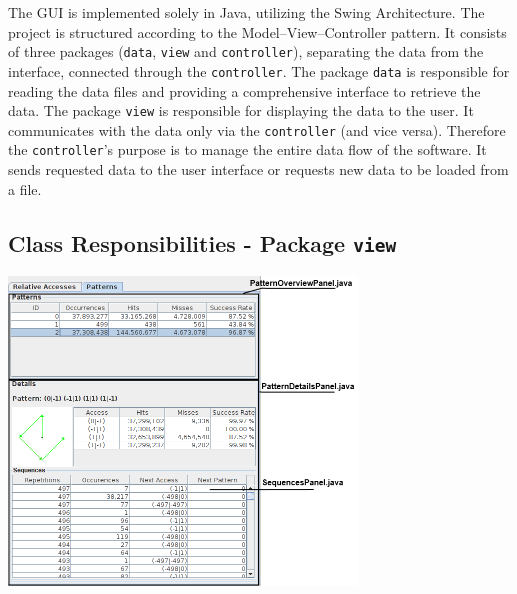 The GUI is implemented solely in Java, utilizing the Swing Architecture. The project is structured according to the Model–View–Controller pattern. It consists of three packages (\texttt{data}, \texttt{view} and \texttt{controller}), separating the data from the interface, connected through the \texttt{controller}. The package \texttt{data} is responsible for reading the data files and providing a comprehensive interface to retrieve the data. The package \texttt{view} is responsible for displaying the data to the user. It communicates with the data only via the \texttt{controller} (and vice versa). Therefore the \texttt{controller}'s purpose is to manage the entire data flow of the software. It sends requested data to the user interface or requests new data to be loaded from a file. 

\subsection{Class Responsibilities - Package \texttt{view}}
\includegraphics[width=350px]{gui/classresp2.png}
\newpage 
